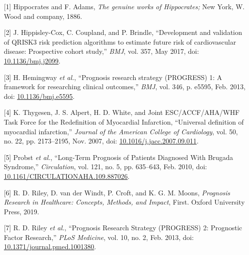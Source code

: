 \documentclass[12pt,PhD,twoside,openright]{muthesis}
\newenvironment{cslreferences}%
  {}%
  {\par}
\begin{document}

\noindent

\setlength{\parindent}{-0.20in}
\setlength{\leftskip}{0.20in}
\setlength{\parskip}{8pt}

\hypertarget{refs}{}
\begin{cslreferences}
\leavevmode\hypertarget{ref-hippocrates_genuine_1886}{}%
{[}1{]} Hippocrates and F. Adams, \emph{The genuine works of Hippocrates;} New York, W. Wood and company, 1886.

\leavevmode\hypertarget{ref-hippisley-cox_development_2017}{}%
{[}2{]} J. Hippisley-Cox, C. Coupland, and P. Brindle, ``Development and validation of QRISK3 risk prediction algorithms to estimate future risk of cardiovascular disease: Prospective cohort study,'' \emph{BMJ}, vol. 357, May 2017, doi: \href{https://doi.org/10.1136/bmj.j2099}{10.1136/bmj.j2099}.

\leavevmode\hypertarget{ref-hemingway_prognosis_2013}{}%
{[}3{]} H. Hemingway \emph{et al.}, ``Prognosis research strategy (PROGRESS) 1: A framework for researching clinical outcomes,'' \emph{BMJ}, vol. 346, p. e5595, Feb. 2013, doi: \href{https://doi.org/10.1136/bmj.e5595}{10.1136/bmj.e5595}.

\leavevmode\hypertarget{ref-thygesen_universal_2007}{}%
{[}4{]} K. Thygesen, J. S. Alpert, H. D. White, and Joint ESC/ACCF/AHA/WHF Task Force for the Redefinition of Myocardial Infarction, ``Universal definition of myocardial infarction,'' \emph{Journal of the American College of Cardiology}, vol. 50, no. 22, pp. 2173--2195, Nov. 2007, doi: \href{https://doi.org/10.1016/j.jacc.2007.09.011}{10.1016/j.jacc.2007.09.011}.

\leavevmode\hypertarget{ref-probst_long-term_2010}{}%
{[}5{]} Probst \emph{et al.}, ``Long-Term Prognosis of Patients Diagnosed With Brugada Syndrome,'' \emph{Circulation}, vol. 121, no. 5, pp. 635--643, Feb. 2010, doi: \href{https://doi.org/10.1161/CIRCULATIONAHA.109.887026}{10.1161/CIRCULATIONAHA.109.887026}.

\leavevmode\hypertarget{ref-riley_prognosis_2019}{}%
{[}6{]} R. D. Riley, D. van der Windt, P. Croft, and K. G. M. Moons, \emph{Prognosis Research in Healthcare: Concepts, Methods, and Impact}, First. Oxford University Press, 2019.

\leavevmode\hypertarget{ref-riley_prognosis_2013}{}%
{[}7{]} R. D. Riley \emph{et al.}, ``Prognosis Research Strategy (PROGRESS) 2: Prognostic Factor Research,'' \emph{PLoS Medicine}, vol. 10, no. 2, Feb. 2013, doi: \href{https://doi.org/10.1371/journal.pmed.1001380}{10.1371/journal.pmed.1001380}.


\end{cslreferences}
\end{document}
